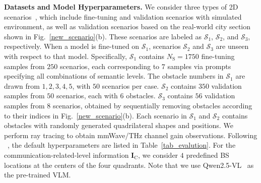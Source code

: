 \documentclass[journal,12pt,onecolumn,draftclsnofoot]{IEEEtran}
\newcommand\SC{\ensuremath{\mathcal{S}}}
\newcommand\FIF{\ensuremath{\mathbf{I}}}
\newcommand\CR{\ensuremath{\mathrm{C}}}
\newcommand\SR{\ensuremath{\mathrm{S}}}
\begin{document}
{\bf Datasets and Model Hyperparameters.} We consider three types of 2D scenarios~\cite{hu2025advancing}, which include fine-tuning and validation scenarios with simulated environment, as well as validation scenarios based on the real-world city section shown in Fig.~\ref{new_scenario}(b). These scenarios are labeled as \( \SC_1 \), \( \SC_2 \), and \( \SC_3 \), respectively. When a model is fine-tuned on \( \SC_1 \), scenarios \( \SC_2 \) and \( \SC_3 \) are unseen with respect to that model. Specifically, $\SC_1$ contains $N_{\SR}=1750$ fine-tuning samples from $250$ scenarios, each corresponding to $7$ samples via prompts specifying all combinations of semantic levels. The obstacle numbers in $\SC_1$ are drawn from ${1,2,3,4,5}$, with $50$ scenarios per case. $\SC_2$ contains $350$ validation samples from $50$ scenarios, each with $6$ obstacles. $\SC_3$ contains $56$ validation samples from $8$ scenarios, obtained by sequentially removing obstacles according to their indices in Fig.~\ref{new_scenario}(b). Each scenario in \( \SC_1\) and \( \SC_2\) contains obstacles with randomly generated quadrilateral shapes and positions. We perform ray tracing to obtain mmWave/THz channel gain observations. Following ~\cite{hu2025advancing}, the default hyperparameters are listed in Table~\ref{tab_evalution}. For the communication-related-level information $\FIF_{\CR}$, we consider $4$ predefined BS locations at the centers of the four quadrants. Note that we use Qwen2.5-VL~\cite{bai2025qwen2} as the pre-trained VLM.
\end{document}
